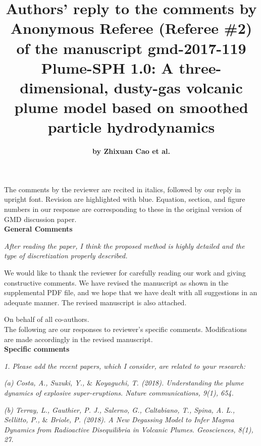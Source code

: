 \documentclass{article}
\begin{document}
\author{\Large \textbf{by Zhixuan Cao et al.}}

\title{ \Large{ Authors' reply to the comments by Anonymous Referee (Referee \#2) of the manuscript gmd-2017-119} \\
\LARGE \textbf{Plume-SPH 1.0: A three-dimensional, dusty-gas volcanic plume model based on smoothed particle hydrodynamics}}

\date{\vspace{-5ex}}

\maketitle
The comments by the reviewer are recited in italics, followed by our reply in upright font. Revision are highlighted with blue. Equation, section, and figure numbers   in our response are corresponding to these in the original 
version of GMD discussion paper. \\[12pt]

\textbf{\large General Comments}

\textit{After reading the paper, I think the proposed method is highly detailed and the type of discretization properly described.} 

We would like to thank the reviewer for carefully reading our work and giving constructive comments.
We have revised the manuscript as shown in the supplemental PDF file, and we hope that we have dealt with all suggestions in an adequate manner. The revised manuscript is also attached.
 
On behalf of all co-authors. \\[1pt]

The following are our responses to reviewer's specific comments. Modifications are made accordingly in the revised manuscript. \\[12pt]

\textbf{\large Specific comments}

\textit{1. Please add the recent papers, which I consider, are related to your research: }

\textit{(a) Costa, A., Suzuki, Y., $\&$ Koyaguchi, T. (2018). Understanding the plume dynamics of explosive super-eruptions. Nature communications, 9(1), 654.}

\textit{(b) Terray, L., Gauthier, P. J., Salerno, G., Caltabiano, T., Spina, A. L., Sellitto, P., $\&$ Briole, P. (2018). A New Degassing Model to Infer Magma Dynamics from Radioactive Disequilibria in Volcanic Plumes. Geosciences, 8(1), 27.}
\end{document}

